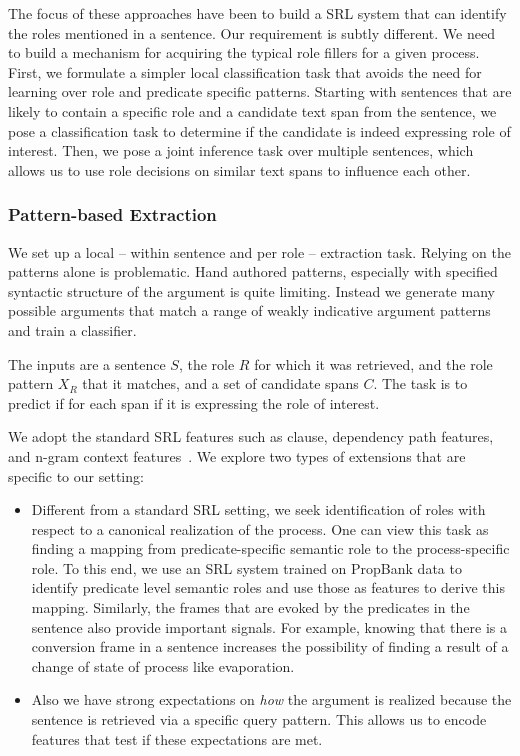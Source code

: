 The focus of these approaches have been to build a SRL system that can identify the roles mentioned in a sentence. 
Our requirement is subtly different. We need to build a mechanism for acquiring the typical role fillers for a given process. 
First, we formulate a simpler local classification task that avoids the need for learning over role and predicate specific patterns. 
Starting with sentences that are likely to contain a specific role and a candidate text span from the sentence, 
we pose a classification task to determine if the candidate  is indeed expressing role of interest. 
Then, we pose a joint inference task over multiple sentences, which allows us to use role decisions on similar 
text spans to influence each other. 

\subsubsection{Pattern-based Extraction}

We set up a local -- within sentence and per role -- extraction task. Relying on the patterns alone is problematic. Hand authored patterns, especially with specified syntactic structure of the argument is quite limiting. Instead we generate many possible arguments that match a range of weakly indicative argument patterns and train a classifier. 

The inputs are a sentence $S$, the role $R$ for which it was retrieved, and the role pattern $X_R$ that it matches, and a set of candidate spans $C$.
The task is to predict if for each span if it is expressing the role of interest. 

We adopt the standard SRL features such as clause, dependency path features, and n-gram context features~\cite{gildea2002automatic,koomen2005generalized}. 
We explore two types of extensions that are specific to our setting:
\begin{itemize}

\item Different from a standard SRL setting, we seek identification of roles with respect to a canonical realization of the process. 
One can view this task as finding a mapping from predicate-specific semantic role to the process-specific role. 
To this end, we use an SRL system trained on PropBank data to identify predicate level semantic roles and use those as features to derive this mapping.
Similarly, the frames that are evoked by the predicates in the sentence also provide important signals. For example, knowing that there is a conversion 
frame in a sentence increases the possibility of finding a result of a change of state of process like evaporation. 

\item Also we have strong expectations on {\em how} the argument is realized because the sentence is retrieved via a specific query pattern.
This allows us to encode features that test if these expectations are met. 

\end{itemize}



